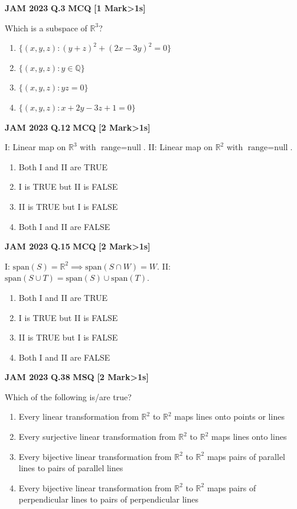 \documentclass[11pt,a4paper]{article}
\newcommand{\pyqheader}[4]{%
    \noindent\begin{tcolorbox}[
        colback=badgebg,
        colframe=secondary,
        arc=2mm,
        boxrule=0.6pt,
        top=1.5mm,bottom=1.5mm,left=2mm,right=2mm
    ]
        \textbf{\textcolor{primary}{JAM #1}} \hfill \textbf{Q.#2} \hfill \textsc{\textbf{#3}} \hfill \textbf{[#4 Mark\ifnum#4>1s\fi]}
    \end{tcolorbox}\vspace{-1mm}
}
\begin{document}
\pyqheader{2023}{3}{MCQ}{1}
Which is a subspace of $\mathbb{R}^{3}$?
\begin{enumerate}[label=(\Alph*)]
    \item $\{(x,y,z): (y+z)^{2}+(2x-3y)^{2}=0\}$
    \item $\{(x,y,z): y\in\mathbb{Q}\}$
    \item $\{(x,y,z): yz=0\}$
    \item $\{(x,y,z): x+2y-3z+1=0\}$
\end{enumerate}

\pyqheader{2023}{12}{MCQ}{2}
I: Linear map on $\mathbb{R}^{3}$ with $\text{range}=\text{null}$. II: Linear map on $\mathbb{R}^{2}$ with $\text{range}=\text{null}$.
\begin{enumerate}[label=(\Alph*)]
    \item Both I and II are TRUE
    \item I is TRUE but II is FALSE
    \item II is TRUE but I is FALSE
    \item Both I and II are FALSE
\end{enumerate}

\pyqheader{2023}{15}{MCQ}{2}
I: $\text{span}(S)=\mathbb{R}^{2}\implies\text{span}(S\cap W)=W$. II: $\text{span}(S\cup T)=\text{span}(S)\cup\text{span}(T)$.
\begin{enumerate}[label=(\Alph*)]
    \item Both I and II are TRUE
    \item I is TRUE but II is FALSE
    \item II is TRUE but I is FALSE
    \item Both I and II are FALSE
\end{enumerate}

\pyqheader{2023}{38}{MSQ}{2}
Which of the following is/are true?
\begin{enumerate}[label=(\Alph*)]
    \item Every linear transformation from $\mathbb{R}^2$ to $\mathbb{R}^2$ maps lines onto points or lines
    \item Every surjective linear transformation from $\mathbb{R}^2$ to $\mathbb{R}^2$ maps lines onto lines
    \item Every bijective linear transformation from $\mathbb{R}^2$ to $\mathbb{R}^2$ maps pairs of parallel lines to pairs of parallel lines
    \item Every bijective linear transformation from $\mathbb{R}^2$ to $\mathbb{R}^2$ maps pairs of perpendicular lines to pairs of perpendicular lines
\end{enumerate}
\end{document}
